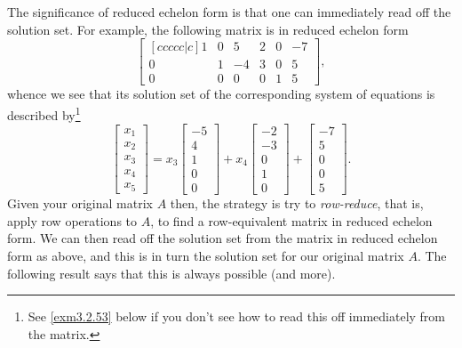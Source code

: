 The significance of reduced echelon form is that one can immediately read off the solution set.  For example, the following matrix is in reduced echelon form
\begin{equation}\label{eqn1.1.108}
\begin{bmatrix}[c c c c c | c]
1 & 0 & 5 & 2 & 0 & -7 \\ 0 & 1 & -4 & 3 & 0 & 5 \\ 0 & 0 & 0 & 0 & 1 & 5
\end{bmatrix},
\end{equation}
whence we see that its solution set of the corresponding system of equations is described by\footnote{See \cref{exm3.2.53} below if you don't see how to read this off immediately from the matrix.}
\begin{equation}\label{eqn3.2.50}
\begin{bmatrix}x_1 \\ x_2 \\ x_3 \\ x_4 \\ x_5\end{bmatrix}=x_3\begin{bmatrix}-5 \\ 4 \\ 1 \\ 0 \\ 0\end{bmatrix}+x_4\begin{bmatrix}-2 \\ -3 \\ 0 \\ 1 \\ 0\end{bmatrix}+\begin{bmatrix}-7 \\ 5 \\ 0 \\ 0 \\ 5\end{bmatrix}.
\end{equation}
Given your original matrix $A$ then, the strategy is try to \emph{row-reduce}, that is, apply row operations to $A$, to find a row-equivalent matrix in reduced echelon form.  We can then read off the solution set from the matrix in reduced echelon form as above, and this is in turn the solution set for our original matrix $A$.  The following result says that this is always possible (and more).

